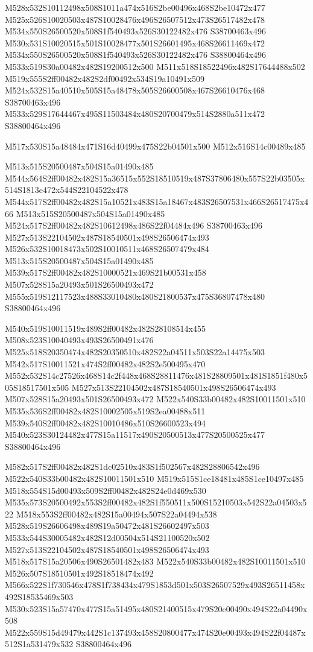 \documentclass{article}
\begin{document}
\begin{multicols}{2}
M528x532S10112498x508S1011a474x516S2be00496x468S2be10472x477 M525x526S10020503x487S10028476x496S26507512x473S26517482x478 M534x550S26500520x508S1f540493x526S30122482x476 S38700463x496 M530x531S10020515x501S10028477x501S26601495x468S26611469x472 M534x550S26500520x508S1f540493x526S30122482x476 S38800464x496 M533x519S30a00482x482S19200512x500 M511x518S18522496x482S17644488x502 M519x555S2ff00482x482S2df00492x534S19a10491x509 M524x532S15a40510x505S15a48478x505S26600508x467S26610476x468 S38700463x496 M533x529S17644467x495S11503484x480S20700479x514S2880a511x472 S38800464x496

\begin{center}
M517x530S15a48484x471S16d40499x475S22b04501x500 M512x516S14c00489x485 
\end{center}


M513x515S20500487x504S15a01490x485 M544x564S2ff00482x482S15a36515x552S18510519x487S37806480x557S22b03505x514S1813e472x544S22104522x478 M544x517S2ff00482x482S15a10521x483S15a18467x483S26507531x466S26517475x466 M513x515S20500487x504S15a01490x485 M524x517S2ff00482x482S10612498x486S22f04484x496 S38700463x496 M527x513S22104502x487S18540501x498S26506474x493 M526x532S10018473x502S10010511x468S26507479x484 M513x515S20500487x504S15a01490x485 M539x517S2ff00482x482S10000521x469S21b00531x458 M507x528S15a20493x501S26500493x472 M555x519S12117523x488S33010480x480S21800537x475S36807478x480 S38800464x496

M540x519S10011519x489S2ff00482x482S28108514x455 M508x523S10040493x493S26500491x476 M525x518S20350474x482S20350510x482S22a04511x503S22a14475x503 M542x517S10011521x474S2ff00482x482S2e500495x470 M552x532S14c27526x468S14c2f448x468S28811476x481S28809501x481S1851f480x505S18517501x505 M527x513S22104502x487S18540501x498S26506474x493 M507x528S15a20493x501S26500493x472 M522x540S33b00482x482S10011501x510 M535x536S2ff00482x482S10002505x519S2ea00488x511 M539x540S2ff00482x482S10010486x510S26600523x494 M540x523S30124482x477S15a11517x490S20500513x477S20500525x477 S38800464x496

M582x517S2ff00482x482S1dc02510x483S1f502567x482S28806542x496 M522x540S33b00482x482S10011501x510 M519x515S1ce18481x485S1ce10497x485 M518x554S15d00493x509S2ff00482x482S24e0d469x530 M535x573S20500492x553S2ff00482x482S1f550511x500S15210503x542S22a04503x522 M518x553S2ff00482x482S15a00494x507S22a04494x538 M528x519S26606498x489S19a50472x481S26602497x503 M533x544S30005482x482S12d00504x514S21100520x502 M527x513S22104502x487S18540501x498S26506474x493 M518x517S15a20506x490S26501482x483 M522x540S33b00482x482S10011501x510 M526x507S18510501x492S18518474x492 M566x522S1f730546x478S1f738434x479S1853d501x503S26507529x493S26511458x492S18535469x503 M530x523S15a57470x477S15a51495x480S21400515x479S20e00490x494S22a04490x508 M522x559S15d49479x442S1c137493x458S20800477x474S20e00493x494S22f04487x512S1a531479x532 S38800464x496


\end{multicols}
\end{document}
